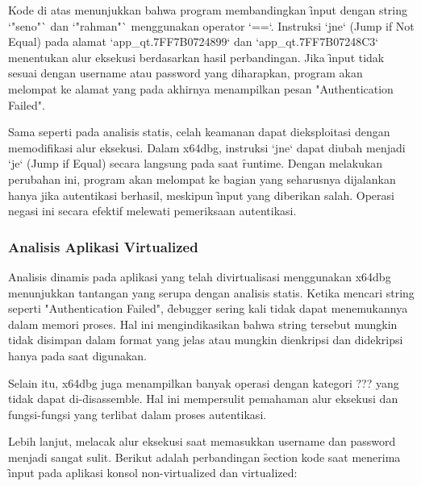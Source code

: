 Kode di atas menunjukkan bahwa program membandingkan \f{input} dengan string `"seno"` dan `"rahman"` menggunakan operator `==`. Instruksi `jne` (Jump if Not Equal) pada alamat `app\_qt.7FF7B0724899` dan `app\_qt.7FF7B07248C3` menentukan alur eksekusi berdasarkan hasil perbandingan. Jika \f{input} tidak sesuai dengan username atau password yang diharapkan, program akan melompat ke alamat yang pada akhirnya menampilkan pesan "Authentication Failed".

Sama seperti pada analisis statis, celah keamanan dapat dieksploitasi dengan memodifikasi alur eksekusi. Dalam x64dbg, instruksi `jne` dapat diubah menjadi `je` (Jump if Equal) secara langsung pada saat \f{runtime}. Dengan melakukan perubahan ini, program akan melompat ke bagian yang seharusnya dijalankan hanya jika autentikasi berhasil, meskipun \f{input} yang diberikan salah. Operasi negasi ini secara efektif melewati pemeriksaan autentikasi.

\subsubsection{Analisis Aplikasi Virtualized}

Analisis dinamis pada aplikasi yang telah divirtualisasi menggunakan x64dbg menunjukkan tantangan yang serupa dengan analisis statis. Ketika mencari string seperti "Authentication Failed", \f{debugger} sering kali tidak dapat menemukannya dalam memori proses. Hal ini mengindikasikan bahwa string tersebut mungkin tidak disimpan dalam format yang jelas atau mungkin dienkripsi dan didekripsi hanya pada saat digunakan.

Selain itu, x64dbg juga menampilkan banyak operasi dengan kategori ??? yang tidak dapat di-\f{disassemble}. Hal ini mempersulit pemahaman alur eksekusi dan fungsi-fungsi yang terlibat dalam proses autentikasi.

Lebih lanjut, melacak alur eksekusi saat memasukkan username dan password menjadi sangat sulit. Berikut adalah perbandingan \f{section} kode saat menerima \f{input} pada aplikasi konsol non-virtualized dan virtualized:

